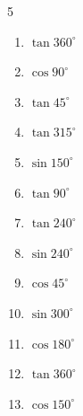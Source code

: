 \begin{multicols}{5}
\begin{enumerate}
  \item $\displaystyle \tan{360^\circ}$

        \phantom{$\displaystyle =0$}

  \item $\displaystyle \cos{90^\circ}$

        \phantom{$\displaystyle =0$}

  \item $\displaystyle \tan{45^\circ}$

        \phantom{$\displaystyle =1$}

  \item $\displaystyle \tan{315^\circ}$

        \phantom{$\displaystyle =-1$}

  \item $\displaystyle \sin{150^\circ}$


  \item $\displaystyle \tan{90^\circ}$

        \phantom{$\displaystyle なし$}

  \item $\displaystyle \tan{240^\circ}$


  \item $\displaystyle \sin{240^\circ}$


  \item $\displaystyle \cos{45^\circ}$


  \item $\displaystyle \sin{300^\circ}$


  \item $\displaystyle \cos{180^\circ}$

        \phantom{$\displaystyle =-1$}

  \item $\displaystyle \tan{360^\circ}$

        \phantom{$\displaystyle =0$}

\columnbreak %

  \item $\displaystyle \cos{150^\circ}$


\end{enumerate}
\end{multicols}
